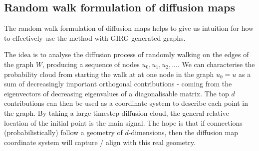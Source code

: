 \subsection{Random walk formulation of diffusion maps}
\label{sec:diff_maps_theory}
The random walk formulation of diffusion maps helps to give us intuition for how to effectively use the method with GIRG generated graphs.

The idea is to analyse the diffusion process of randomly walking on the edges of the graph $W$, producing a sequence of nodes $u_0, u_1, u_2, ...$. We can characterise the probability cloud from starting the walk at at one node in the graph $u_0 = u$ as a sum of decreasingly important orthogonal contributions - coming from the eigenvectors of decreasing eigenvalues of a diagonalisable matrix.
The top $d$ contributions can then be used as a coordinate system to describe each point in the graph. By taking a large timestep diffusion cloud, the general relative location of the initial point is the main signal. The hope is that if connections (probabilistically) follow a geometry of $d$-dimensions, then the diffusion map coordinate system will capture / align with this real geometry.

